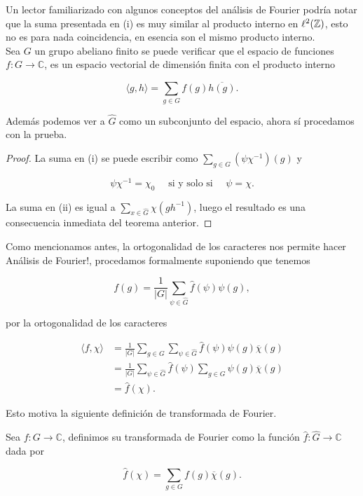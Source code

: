 \begin{note}
Un lector familiarizado con algunos conceptos del análisis de Fourier podría notar que la suma presentada en (i) es muy similar al producto interno en $\ell^2(\mathbb{Z})$, esto no es para nada coincidencia, en esencia son el mismo producto interno.\\

Sea $G$ un grupo abeliano finito se puede verificar que el espacio de funciones $ f:G \to \mathbb{C}$, es un espacio vectorial de dimensión finita con el producto interno

$$
\langle g, h \rangle = \sum_{g \in G} f(g) \overline{h(g)}.
$$

Además podemos ver a  $\widehat{G}$ como un subconjunto del espacio, ahora sí procedamos con la prueba.\\
\end{note}

\begin{proof}
La suma en (i) se puede escribir como $\displaystyle\sum_{g \in G}\left(\psi \chi^{-1}\right)(g)$ y

$$
\psi \chi^{-1}=\chi_0 \quad \text { si y solo si } \quad \psi=\chi.
$$


La suma en (ii) es igual a $\displaystyle\sum_{x \in \widehat{G}} \chi\left(g h^{-1}\right)$, luego el resultado es una consecuencia inmediata del teorema anterior.
\end{proof}

Como mencionamos antes, la ortogonalidad de los caracteres nos permite hacer Análisis de Fourier!, procedamos formalmente suponiendo que tenemos 

$$
f(g)=\frac{1}{|G|}\sum_{\psi \in \widehat{G}}\widehat{f}(\psi) \psi(g),
$$

por la ortogonalidad de los caracteres

\begin{align*}
    \langle f, \chi\rangle&=\frac{1}{|G|}\sum_{g\in G}\sum_{\psi \in \widehat{G}}\widehat{f}(\psi) \psi(g)\overline{\chi}(g)\\
    &=\frac{1}{|G|}\sum_{\psi \in \widehat{G}}\widehat{f}(\psi)\sum_{g\in G}\psi(g)\overline{\chi}(g)\\
    &=\widehat{f}(\chi)
.\end{align*}

Esto motiva la siguiente definición de transformada de Fourier.

\begin{definition}
Sea $f: G \rightarrow \mathbb{C}$, definimos su transformada de Fourier como la función $\widehat{f}: \widehat{G} \rightarrow \mathbb{C}$ dada por

$$
\widehat{f}(\chi)=\sum_{g\in G} f(g) \overline{\chi}(g).
$$

\end{definition}

